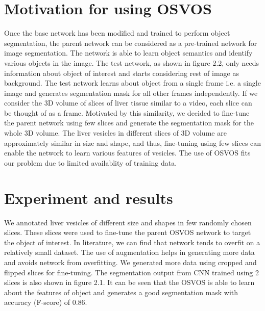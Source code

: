\section{Motivation for using OSVOS}
Once the base network has been modified and trained to perform object segmentation, the parent network can be considered as a pre-trained network for image segmentation. The network is able to learn object semantics and identify various objects in the image. The test network, as shown in figure 2.2, only needs information about object of interest and starts considering rest of image as background. The test network learns about object from a single frame i.e. a single image and generates segmentation mask for all other frames independently. If we consider the 3D volume of slices of liver tissue similar to a video, each slice can be thought of as a frame. Motivated by this similarity, we decided to fine-tune the parent network using few slices and generate the segmentation mask for the whole 3D volume. The liver vesicles in different slices of 3D volume are approximately similar in size and shape, and thus, fine-tuning using few slices can enable the network to learn various features of vesicles. The use of OSVOS fits our problem due to limited availablity of training data. 

\section{Experiment and results}
We annotated liver vesicles of different size and shapes in few randomly chosen slices. These slices were used to fine-tune the parent OSVOS network to target the object of interest. In literature, we can find that network tends to overfit on a relatively small dataset. The use of augmentation helps in generating more data and avoids network from overfitting. We generated more data using cropped and flipped slices for fine-tuning. The segmentation output from CNN trained using 2 slices is also shown in figure 2.1. It can be seen that the OSVOS is able to learn about the features of object and generates a good segmentation mask with accuracy (F-score) of 0.86.\par

